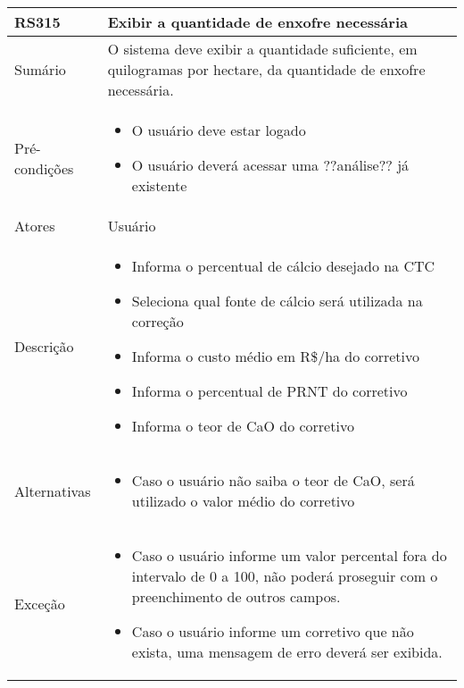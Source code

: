\begin{quadro}[!htb]
    \begin{tabular}{|p{3cm}|p{11cm}|}
        \hline
        \textbf{RS315} & \textbf{Exibir a quantidade de enxofre necessária} \\
        \hline
        Sumário        & O sistema deve exibir a quantidade suficiente, em quilogramas por hectare, da quantidade de enxofre necessária.                  \\
        \hline
        Pré-condições  & \begin{itemize}
            \item O usuário deve estar logado
            \item O usuário deverá acessar uma ??análise?? já existente 
        \end{itemize}                 \\
        \hline
        Atores         & Usuário                  \\
        \hline
        Descrição      &
        \begin{itemize}
            \item Informa o percentual de cálcio desejado na CTC
            \item Seleciona qual fonte de cálcio será utilizada na correção
            \item Informa o custo médio em R\$/ha do corretivo
            \item Informa o percentual de PRNT do corretivo
            \item Informa o teor de CaO do corretivo
        \end{itemize}                 \\
        \hline
        Alternativas   &
        \begin{itemize}
            \item Caso o usuário não saiba o teor de CaO, será utilizado o valor médio do corretivo
        \end{itemize}                 \\
        \hline
        Exceção        &
        \begin{itemize}
            \item Caso o usuário informe um valor percental fora do intervalo de 0 a 100, não poderá proseguir com o preenchimento de outros campos.
            \item Caso o usuário informe um corretivo que não exista, uma mensagem de erro deverá ser exibida.
        \end{itemize}                   \\
        \hline
    \end{tabular}
\end{quadro}

